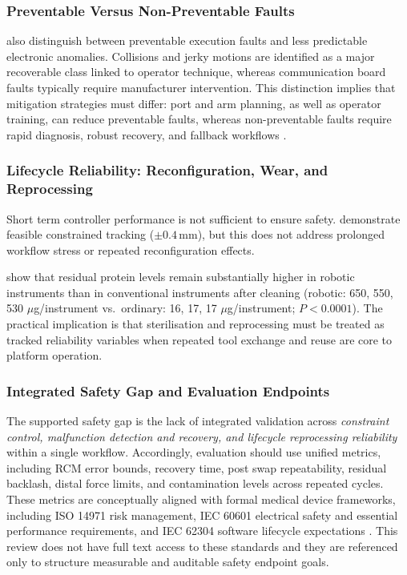 \documentclass[12pt]{article}
\begin{document}
\subsubsection{Preventable Versus Non-Preventable Faults}

\textcite{rajih2017error} also distinguish between preventable execution faults and
less predictable electronic anomalies. Collisions and jerky motions are
identified as a major recoverable class linked to operator technique, whereas
communication board faults typically require manufacturer intervention.
This distinction implies that mitigation
strategies must differ: port and arm planning, as well as operator training, can
reduce preventable faults, whereas non-preventable faults require rapid diagnosis, 
robust recovery, and fallback workflows \parencite{rajih2017error}.

\subsubsection{Lifecycle Reliability: Reconfiguration, Wear, and Reprocessing}

Short term controller performance is not sufficient to ensure safety. \textcite{sadeghian2019constrained} demonstrate
feasible constrained tracking ($\pm 0.4\,\mathrm{mm}$), but this does not address
prolonged workflow stress or repeated reconfiguration effects.

\textcite{saito2017contamination} show that residual protein
levels remain substantially higher in robotic instruments than in conventional
instruments after cleaning (robotic: 650, 550, 530 $\mu$g/instrument
vs.\ ordinary: 16, 17, 17 $\mu$g/instrument; $P<0.0001$). The
practical implication is that sterilisation and reprocessing must be treated as
tracked reliability variables when repeated tool exchange and reuse are core to
platform operation.

\subsubsection{Integrated Safety Gap and Evaluation Endpoints}

The supported safety gap is the lack of integrated validation across \emph{constraint control,
malfunction detection and recovery, and lifecycle reprocessing reliability}
within a single workflow.
Accordingly, evaluation should use unified metrics, including RCM
error bounds, recovery time, post swap repeatability, residual backlash, distal
force limits, and contamination levels across repeated cycles.
These metrics are conceptually aligned with formal medical
device frameworks, including ISO 14971 risk management, IEC 60601 electrical
safety and essential performance requirements, and IEC 62304 software
lifecycle expectations \parencite{iso14971_2019, iec60601_2005a1_2012, iec62304_2006a1_2015}.
This review does not have full text access to these standards and they are referenced only to
structure measurable and auditable safety endpoint goals.
\end{document}
